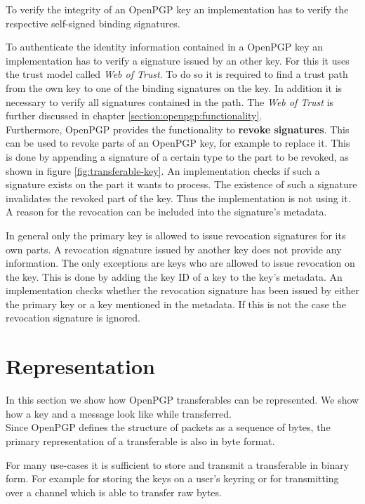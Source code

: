 To verify the integrity of an OpenPGP key an implementation has to verify the respective self-signed binding signatures. 

To authenticate the identity information contained in a OpenPGP key an implementation has to verify a signature issued by an other key. For this it uses the trust model called \textit{Web of Trust}. To do so it is required to find a trust path from the own key to one of the binding signatures on the key. In addition it is necessary to verify all signatures contained in the path. The \textit{Web of Trust} is further discussed in chapter \ref{section:openpgp:functionality}. \\

Furthermore, OpenPGP provides the functionality to \textbf{revoke signatures}. This can be used to revoke parts of an OpenPGP key, for example to replace it. This is done by appending a signature of a certain type to the part to be revoked, as shown in figure \ref{fig:transferable-key}. An implementation checks if such a signature exists on the part it wants to process. The existence of such a signature invalidates the revoked part of the key. Thus the implementation is not using it. A reason for the revocation can be included into the signature's metadata. 

In general only the primary key is allowed to issue revocation signatures for its own parts. A revocation signature issued by another key does not provide any information. The only exceptions are keys who are allowed to issue revocation on the key. This is done by adding the key ID of a key to the key's metadata. An implementation checks whether the revocation signature has been issued by either the primary key or a key mentioned in the metadata. If this is not the case the revocation signature is ignored.

\section{Representation}
\label{section:messageformat:asciia}

In this section we show how OpenPGP transferables can be represented. We show how a key and a message look like while transferred. \\

Since OpenPGP defines the structure of packets as a sequence of bytes, the primary representation of a transferable is also in byte format.

For many use-cases it is sufficient to store and transmit a transferable in binary form. For example for storing the keys on a user's keyring or for transmitting over a channel which is able to transfer raw bytes. \\


